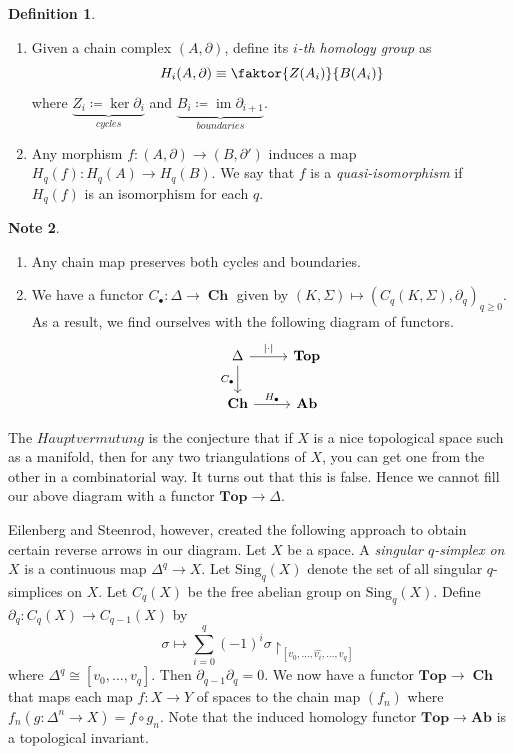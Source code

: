 \documentclass[10pt,letterpaper,cm]{nupset}
\theoremstyle{definition}
\newtheorem{definition}{Definition}[subsection]
\newtheorem{note}[definition]{Note}
\theoremstyle{theorem}
\theoremstyle{remark}
\newcommand{\1}{\mathbb{1}}
\newcommand{\0}{\vec 0}
\DeclareMathOperator{\im}{im}
\DeclareMathOperator{\ch}{\mathbf{Ch}}
\begin{document}
\begin{definition} $ $
\begin{enumerate}
\item Given a chain complex $\left(A, \partial\right)$, define its \textit{$i$-th homology group} as $$ H_i(A, \partial) \equiv \faktor{Z(A_i)}{B(A_i)} $$ where $\underbrace{Z_i \coloneqq  \ker{\partial_{i}}}_{\textit{cycles}}$ and $\underbrace{B_i \coloneqq  \im{\partial_{i+1}}}_{\textit{boundaries}}$. 
\item Any morphism $f: \left(A, \partial\right) \to \left(B, \partial '\right)$ induces a map $H_q(f) : H_q(A) \to H_q(B)$. We say that $f$ is a \textit{quasi-isomorphism} if $H_q(f)$ is an isomorphism for each $q$. 
\end{enumerate}
\end{definition}

\begin{note} $ $
\begin{enumerate}
\item Any chain map preserves both cycles and boundaries.
\item We have a functor $C_{\bullet}: \Delta \to \ch$ given by $\left(K, \Sigma\right) \mapsto \left(C_q(K, \Sigma), \partial_{q}\right)_{q\geq 0}$. As a result, we find ourselves with the following diagram of functors.
\[
\begin{tikzcd}
\Delta \arrow[d, "C_{\bullet}"'] \arrow[r, "\left\lvert{\cdot}\right\rvert"] & \mathbf{Top} \\
\ch \arrow[r, "H_{\bullet}"] & \mathbf{Ab}
\end{tikzcd}
\]
\end{enumerate}
\end{note}

\smallskip

The $\textit{Hauptvermutung}$ is the conjecture that if $X$ is a nice topological space such as a manifold, then for any two triangulations of $X$, you  can get one from the other in a combinatorial way. It turns out that this is false. Hence we cannot fill our above diagram with a functor $\mathbf{Top} \to \Delta$.

Eilenberg and Steenrod, however, created the following approach to obtain certain reverse arrows in our diagram. Let $X$ be a space. A \textit{singular $q$-simplex on $X$}  is a continuous map $\Delta^q \to X$. Let $\text{Sing}_q(X)$ denote the set of all singular $q$-simplices on $X$. Let $C_q(X)$ be the free abelian group on $\text{Sing}_q(X)$. Define $\partial_{q} : C_q(X) \to C_{q-1}(X)$ by 
$$\sigma \mapsto \sum_{i=0}^q({-1})^i \sigma \restriction_{\left[v_0, \ldots, \widehat{v_i}, \ldots, v_q\right]}$$ 
where $\Delta^q \cong \left[v_0, \ldots, v_q\right]$. Then $\partial_{q-1}\partial_q =0$. We now have a functor $\mathbf{Top} \to \ch$ that maps each map $f: X \to Y$ of spaces to the chain map $\left(f_n\right)$ where $f_n(g: \Delta^n \to X) = f \circ g_n$. Note that the induced homology functor $\mathbf{Top} \to \mathbf{Ab}$ is a topological invariant. 
\end{document}
